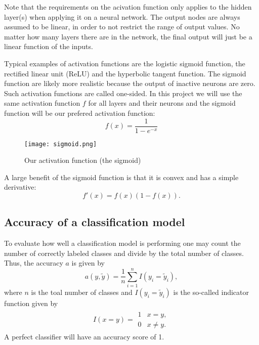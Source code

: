 \documentclass[a4paper,12pt]{article}
\begin{document}
Note that the requirements on the acivation function only applies to the hidden layer(s) when applying it on a neural network. The output nodes are always assumed to be linear, in order to not restrict the range of output values. No matter how many layers there are in the network, the final output will just be a linear function of the inputs.\newline

Typical examples of activation functions are the logistic sigmoid function, the rectified linear unit (ReLU) and the hyperbolic tangent function. The sigmoid function are likely more realistic because the output of inactive neurons are zero. Such activation functions are called one-sided. In this project we will use the same activation function $f$ for all layers and their neurons and the sigmoid function will be our prefered activation function: 
\begin{equation}
    f(x) = \frac{1}{ 1 - e^{-x} }
\end{equation}

\begin{figure}[h!]
  \centering
  \caption{Our activation function (the sigmoid)}
  \texttt{[image: sigmoid.png]}
\end{figure}

A large benefit of the sigmoid function is that it is convex and has a simple derivative:
\begin{equation}
    f'(x) = f(x)(1-f(x)).
\end{equation}

\subsection{Accuracy of a classification model}
To evaluate how well a classification model is performing one may count the number of correctly labeled classes and divide by the total number of classes. Thus, the accuracy $a$ is given by
\begin{equation}
    a(y,\tilde{y}) = \frac{1}{n}\sum_{i=1}^n I(y_i = \tilde{y}_i),
\end{equation}
where $n$ is the toal number of classes and $I(y_i = \tilde{y}_i)$ is the so-called indicator function given by
\begin{align}
    I(x = y) = \begin{array}{cc}
    1 & x = y, \\
    0 & x \neq y.
    \end{array}
\end{align}
A perfect classifier will have an accuracy score of 1.
\end{document}

